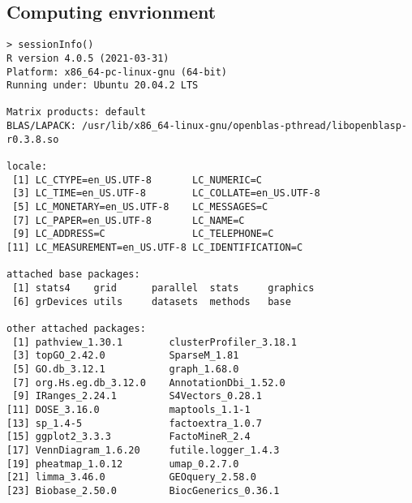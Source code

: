 \subsection*{Computing envrionment}
\begin{lstlisting}
> sessionInfo()
R version 4.0.5 (2021-03-31)
Platform: x86_64-pc-linux-gnu (64-bit)
Running under: Ubuntu 20.04.2 LTS

Matrix products: default
BLAS/LAPACK: /usr/lib/x86_64-linux-gnu/openblas-pthread/libopenblasp-r0.3.8.so

locale:
 [1] LC_CTYPE=en_US.UTF-8       LC_NUMERIC=C              
 [3] LC_TIME=en_US.UTF-8        LC_COLLATE=en_US.UTF-8    
 [5] LC_MONETARY=en_US.UTF-8    LC_MESSAGES=C             
 [7] LC_PAPER=en_US.UTF-8       LC_NAME=C                 
 [9] LC_ADDRESS=C               LC_TELEPHONE=C            
[11] LC_MEASUREMENT=en_US.UTF-8 LC_IDENTIFICATION=C       

attached base packages:
 [1] stats4    grid      parallel  stats     graphics 
 [6] grDevices utils     datasets  methods   base     

other attached packages:
 [1] pathview_1.30.1        clusterProfiler_3.18.1
 [3] topGO_2.42.0           SparseM_1.81          
 [5] GO.db_3.12.1           graph_1.68.0          
 [7] org.Hs.eg.db_3.12.0    AnnotationDbi_1.52.0  
 [9] IRanges_2.24.1         S4Vectors_0.28.1      
[11] DOSE_3.16.0            maptools_1.1-1        
[13] sp_1.4-5               factoextra_1.0.7      
[15] ggplot2_3.3.3          FactoMineR_2.4        
[17] VennDiagram_1.6.20     futile.logger_1.4.3   
[19] pheatmap_1.0.12        umap_0.2.7.0          
[21] limma_3.46.0           GEOquery_2.58.0       
[23] Biobase_2.50.0         BiocGenerics_0.36.1   


\end{lstlisting}
